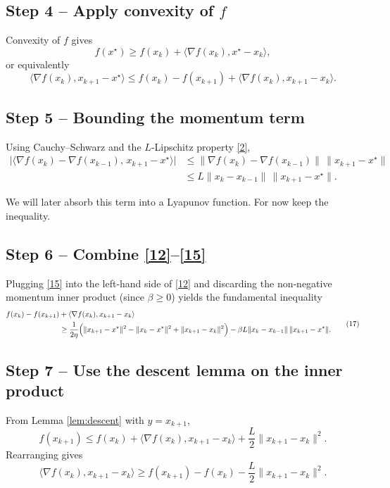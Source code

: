 \documentclass{article}
\begin{document}
\subsection*{Step 4 – Apply convexity of $f$}
Convexity of $f$ gives
\[
f(x^\star)\ge f(x_k)+\langle \nabla f(x_k),x^\star-x_k\rangle,
\]
or equivalently
\[
\langle \nabla f(x_k),x_{k+1}-x^\star\rangle
\le f(x_k)-f(x_{k+1})+\langle \nabla f(x_k),x_{k+1}-x_k\rangle .
\tag{15}
\]

\subsection*{Step 5 – Bounding the momentum term}
Using Cauchy–Schwarz and the $L$‑Lipschitz property \eqref{2},
\[
\begin{aligned}
\big|\langle \nabla f(x_k)-\nabla f(x_{k-1}),\,x_{k+1}-x^\star\rangle\big|
&\le \|\nabla f(x_k)-\nabla f(x_{k-1})\|\,\|x_{k+1}-x^\star\|\\
&\le L\|x_k-x_{k-1}\|\,\|x_{k+1}-x^\star\| .
\end{aligned}
\tag{16}
\]

We will later absorb this term into a Lyapunov function. For now keep the inequality.

\subsection*{Step 6 – Combine \eqref{12}–\eqref{15}}
Plugging \eqref{15} into the left‑hand side of \eqref{12} and discarding the non‑negative momentum inner product (since $\beta\ge0$) yields the fundamental inequality
\[
\begin{aligned}
f(x_k)-f(x_{k+1})
&+\langle \nabla f(x_k),x_{k+1}-x_k\rangle \\
&\ge \frac{1}{2\eta}\Bigl(\|x_{k+1}-x^\star\|^2-\|x_k-x^\star\|^2+\|x_{k+1}-x_k\|^2\Bigr)
-\beta L\|x_k-x_{k-1}\|\,\|x_{k+1}-x^\star\|.
\end{aligned}
\tag{17}
\]

\subsection*{Step 7 – Use the descent lemma on the inner product}
From Lemma \ref{lem:descent} with $y=x_{k+1}$,
\[
f(x_{k+1})\le f(x_k)+\langle \nabla f(x_k),x_{k+1}-x_k\rangle+\frac{L}{2}\|x_{k+1}-x_k\|^2 .
\tag{18}
\]
Rearranging gives
\[
\langle \nabla f(x_k),x_{k+1}-x_k\rangle \ge f(x_{k+1})-f(x_k)-\frac{L}{2}\|x_{k+1}-x_k\|^2 .
\tag{19}
\]
\end{document}
